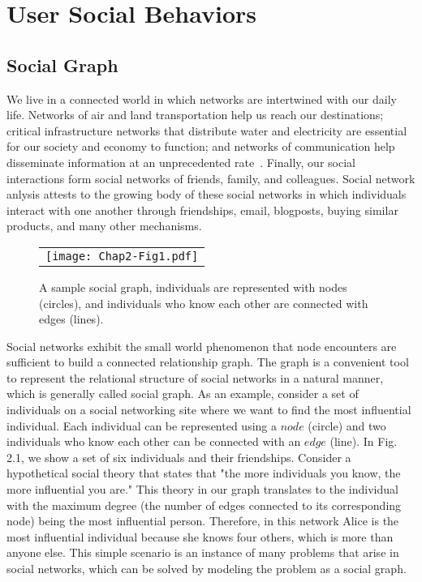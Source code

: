 \section{User Social Behaviors}\label{Chap2_01}

\subsection{Social Graph}\label{Chap2_01_01}
We live in a connected world in which networks are intertwined with our daily life. Networks of air and land transportation help us reach our destinations; critical infrastructure networks that distribute water and electricity are essential for our society and economy to function; and networks of communication help disseminate information at an unprecedented rate~\cite{RZafarani2014}. Finally, our social interactions form social networks of friends, family, and colleagues. Social network anlysis attests to the growing body of these social networks in which individuals interact with one another through friendships, email, blogposts, buying similar products, and many other mechanisms.
\begin{figure}[t]
\begin{center}
  \begin{tabular}{c}
  \texttt{[image: Chap2-Fig1.pdf]}
  \end{tabular}
  \caption{A sample social graph, individuals are represented with nodes (circles), and individuals who know each other are connected with edges (lines).}
\end{center}
\end{figure}

Social networks exhibit the small world phenomenon that node encounters are sufficient to build a connected relationship graph. The graph is a convenient tool to represent the relational structure of social networks in a natural manner, which is generally called social graph. As an example, consider a set of individuals on a social networking site where we want to find the most influential individual. Each individual can be represented using a $node$ (circle) and two individuals who know each other can be connected with an $edge$ (line). In Fig. 2.1, we show a set of six individuals and their friendships. Consider a hypothetical social theory that states that "the more individuals you know, the more influential you are." This theory in our graph translates to the individual with the maximum degree (the number of edges connected to its corresponding node) being the most influential person. Therefore, in this network Alice is the most influential individual because she knows four others, which is more than anyone else. This simple scenario is an instance of many problems that arise in social networks, which can be solved by modeling the problem as a social graph.

